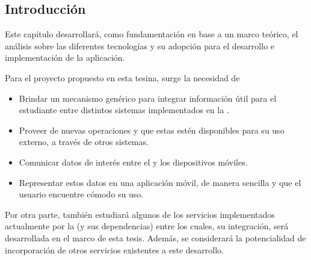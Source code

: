 \subsection{Introducción}
\label{analisis_servicios_introduccion}

Este capítulo desarrollará, como fundamentación en base a un marco teórico, el análisis sobre las diferentes tecnologías y su adopción para el desarrollo e implementación de la aplicación. 

Para el proyecto propuesto en esta tesina, surge la necesidad de 
\begin{itemize}
\item Brindar un mecanismo genérico para integrar información útil para el estudiante entre distintos sistemas implementados en la \unlp{}.
\item Proveer de nuevas operaciones y que estas estén disponibles para su uso externo, a través de otros sistemas.
\item Comunicar datos de interés entre el  y los dispositivos móviles.
\item Representar estos datos en una aplicación móvil, de manera sencilla y que el usuario encuentre cómodo su uso.
\end{itemize}

Por otra parte, también estudiará algunos de los servicios implementados actualmente por la \unlp{} (y sus dependencias) entre los cuales, su integración, será desarrollada en el marco de esta tesis. Además, se considerará la potencialidad de incorporación de otros servicios existentes a este desarrollo.

